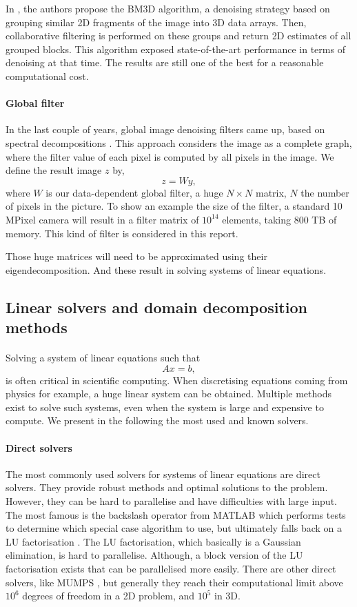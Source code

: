 In \cite{dabov_image_2007}, the authors propose the BM3D algorithm, a denoising strategy based on grouping similar 2D fragments of the image into 3D data arrays.
Then, collaborative filtering is performed on these groups and return 2D estimates of all grouped blocks.
This algorithm exposed state-of-the-art performance in terms of denoising at that time.
The results are still one of the best for a reasonable computational cost.

\paragraph{Global filter}
In the last couple of years, global image denoising filters came up, based on spectral decompositions \cite{glide_2014}.
This approach considers the image as a complete graph, where the filter value of each pixel is computed by all pixels in the image.
We define the result image \(z\) by,
\[z = Wy,\]
where \(W\) is our data-dependent global filter, a huge \(N \times N\) matrix, \(N\) the number of pixels in the picture.
To show an example the size of the filter, a standard 10 MPixel camera will result in a filter matrix of \(10^{14}\) elements, taking 800 TB of memory.
This kind of filter is considered in this report.

Those huge matrices will need to be approximated using their eigendecomposition.
And these result in solving systems of linear equations.

\subsection{Linear solvers and domain decomposition methods}

\paragraph{}
Solving a system of linear equations such that
\[Ax = b,\]
is often critical in scientific computing.
When discretising equations coming from physics for example, a huge linear system can be obtained.
Multiple methods exist to solve such systems, even when the system is large and expensive to compute.
We present in the following the most used and known solvers.

\paragraph{Direct solvers}
The most commonly used solvers for systems of linear equations are direct solvers.
They provide robust methods and optimal solutions to the problem.
However, they can be hard to parallelise and have difficulties with large input.
The most famous is the backslash operator from MATLAB which performs tests to determine which special case algorithm to use, but ultimately falls back on a LU factorisation \cite{mldivide_matlab}.
The LU factorisation, which basically is a Gaussian elimination, is hard to parallelise.
Although, a block version of the LU factorisation exists that can be parallelised more easily.
There are  other direct solvers, like MUMPS \cite{MUMPS_2001}, but generally they reach their computational limit above \(10^6\) degrees of freedom in a 2D problem, and \(10^5\) in 3D.

